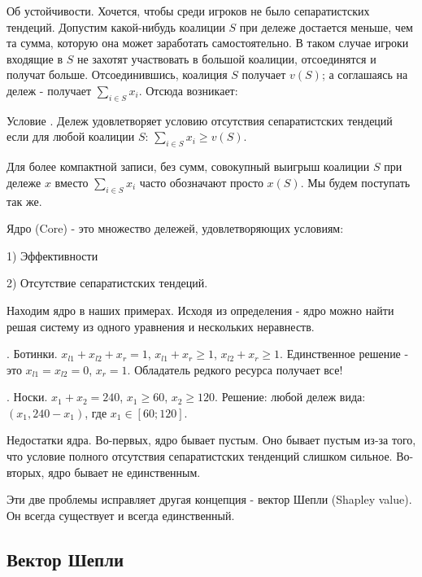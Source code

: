 Об устойчивости. Хочется, чтобы среди игроков не было сепаратистских тендеций. Допустим какой-нибудь коалиции $S$ при дележе достается меньше, чем та сумма, которую она может заработать самостоятельно. В таком случае игроки входящие в $S$ не захотят участвовать в большой коалиции, отсоединятся и получат больше. Отсоединившись, коалиция $S$ получает $v(S)$; а соглашаясь на дележ - получает $\sum_{i\in S} x_{i}$. Отсюда возникает:

\begin{mydef}
Условие  . Дележ удовлетворяет условию отсутствия сепаратистских тендеций если для любой коалиции $S$: $\sum_{i\in S} x_{i}\geq v(S)$. 
\end{mydef}

Для более компактной записи, без сумм, совокупный выигрыш коалиции $S$ при дележе $x$ вместо $\sum_{i\in S} x_{i}$ часто обозначают просто $x(S)$. Мы будем поступать так же.

\begin{mydef} Ядро  (Core) - это множество дележей, удовлетворяющих условиям:

1) Эффективности

2) Отсутствие сепаратистских тендеций.
\end{mydef}

Находим ядро в наших примерах. Исходя из определения - ядро можно найти решая систему из одного уравнения и нескольких неравнеств.

\begin{myex}. Ботинки. $x_{l1}+x_{l2}+x_{r}=1$, $x_{l1}+x_{r}\geq 1$, $x_{l2}+x_{r}\geq 1$. Единственное решение - это $x_{l1}=x_{l2}=0$, $x_{r}=1$. Обладатель редкого ресурса получает все!
\end{myex}

\begin{myex}. Носки. $x_{1}+x_{2}=240$, $x_{1}\geq 60$, $x_{2}\geq 120$. Решение: любой дележ вида: $(x_{1},240-x_{1})$, где $x_{1}\in [60;120]$.
\end{myex}

Недостатки ядра. Во-первых, ядро бывает пустым. Оно бывает пустым из-за того, что условие полного отсутствия сепаратистских тенденций слишком сильное. Во-вторых, ядро бывает не единственным.

Эти две проблемы исправляет другая концепция - вектор Шепли (Shapley value). Он всегда существует и всегда единственный.

\subsection{Вектор Шепли}

